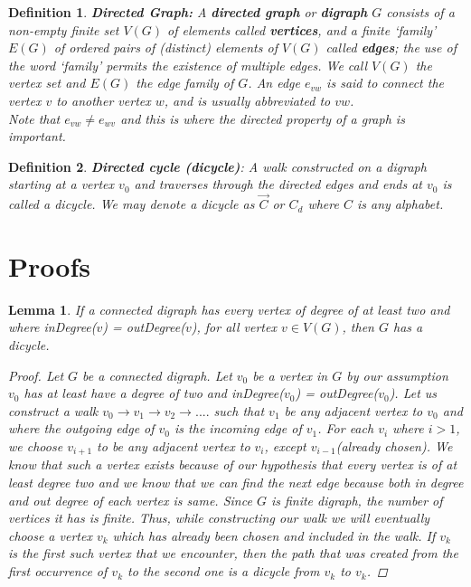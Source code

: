 \documentclass[17pt]{article}
\newtheorem{definition}{Definition}
\newtheorem{lemma}{Lemma}
\begin{document}
\begin{definition} \textbf{Directed Graph:} A \textbf{directed graph} or \textbf{digraph} $G$ consists of a non-empty finite set $V(G)$ of elements called \textbf{vertices},
and a finite `family'  $ E(G)$ of ordered pairs of (distinct) elements
of $V(G)$ called \textbf{edges}; the use of the word `family' permits the existence of multiple edges. We call $V(G)$ the vertex set and $E(G)$ the edge family of $G$. An edge $e_{vw}$ is said to connect the vertex $v$ to another vertex $w$, and is usually abbreviated to $vw$.\\ Note that $e_{vw} \neq e_{wv}$ and this is where the directed property of a graph is important. 
\end{definition}

\begin{definition}\textbf{Directed cycle (dicycle)}: A walk constructed on a digraph starting at a vertex $v_0$ and traverses through the directed edges and ends at $v_0$ is called a dicycle. We may denote a dicycle as $\vec{C}$ or $C_d$ where $C$ is any alphabet.
\end{definition}
\newpage
\section{Proofs}
\begin{lemma} If a connected digraph has every vertex of degree of at least two and where inDegree($v$) = outDegree($v$), for all vertex $v \in V(G)$, then $G$ has a \textit{dicycle}.
\begin{proof}
Let $G$ be a connected digraph. Let $v_0$ be a vertex in $G$ by our assumption $v_0$ has at least have a degree of two and inDegree($v_0$) = outDegree($v_0$). Let us construct a walk $v_0 \rightarrow v_1 \rightarrow v_2 \rightarrow ....$ such that $v_1$ be any adjacent vertex to $v_0$ and where the outgoing edge of $v_0$ is the incoming edge of $v_1$. For each $v_i$ where $i > 1$, we choose $v_{i+1}$ to be any adjacent vertex to $v_i$, except $v_{i-1}$(already chosen). We know that such a vertex exists because of our hypothesis that every vertex is of at least degree two and we know that we can find the next edge because both in degree and out degree of each vertex is same. Since $G$ is finite digraph, the number of vertices it has is finite. Thus, while constructing our walk we will eventually choose a vertex $v_k$ which has already been chosen and included in the walk. If $v_k$ is the first such vertex that we encounter, then the path that was created from the first occurrence of $v_k$ to the second one is a dicycle from $v_k$ to $v_k$.
\end{proof}
\end{lemma}
\end{document}

